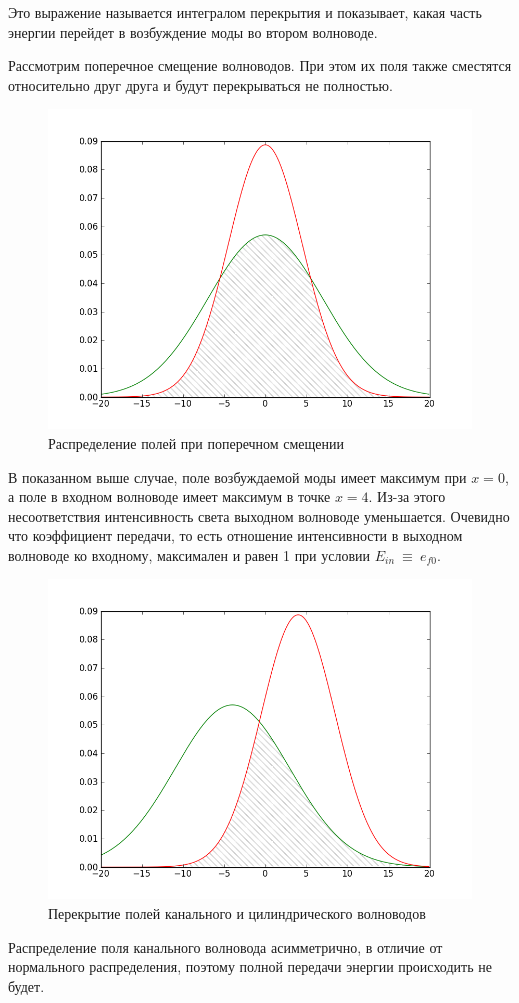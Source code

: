 Это выражение называется интегралом перекрытия  и показывает, какая часть энергии перейдет в возбуждение моды во втором волноводе. 

Рассмотрим поперечное смещение волноводов. При этом их поля также сместятся относительно друг друга и будут перекрываться не полностью.

\begin{figure}[h!]
	\includegraphics[width=.5\textwidth]{img/intersection.png}
	\caption{Распределение полей при поперечном смещении}
	\label{intersection}
\end{figure}

В показанном выше случае, поле возбуждаемой моды имеет максимум при $x=0$, а поле в входном волноводе имеет максимум в точке $x=4$. Из-за этого несоответствия интенсивность света выходном волноводе уменьшается. Очевидно что коэффициент передачи, то есть отношение интенсивности в выходном волноводе ко входному, максимален и равен 1 при условии $E_{in}~\equiv~e_{f0}$.

\begin{figure}[h!]
	\includegraphics[width=.5\textwidth]{img/intersection2.png}
	\caption{Перекрытие полей канального и цилиндрического волноводов}
\end{figure}

Распределение поля канального волновода асимметрично, в отличие от нормального распределения, поэтому полной передачи энергии происходить не будет.


